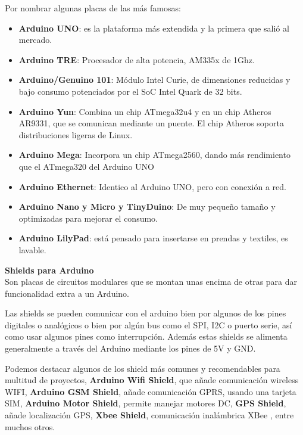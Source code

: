 Por nombrar algunas placas de las más famosas:
\begin{itemize}
	
\item \textbf{Arduino UNO}: es la plataforma más extendida y la primera que salió al mercado.

\item \textbf{Arduino TRE}: Procesador de alta potencia, AM335x de 1Ghz.

\item \textbf{Arduino/Genuino 101}: Módulo Intel Curie, de dimensiones reducidas y bajo consumo potenciados por el SoC Intel Quark de 32 bits.

\item \textbf{Arduino Yun}: Combina un chip ATmega32u4 y en un chip Atheros AR9331, que se comunican mediante un puente. El chip Atheros soporta distribuciones ligeras de Linux. 

\item \textbf{Arduino Mega}: Incorpora un chip ATmega2560, dando más rendimiento que el ATmega320 del Arduino UNO

\item \textbf{Arduino Ethernet}: Identico al Arduino UNO, pero con conexión a red.

\item \textbf{Arduino Nano y Micro y TinyDuino}: De muy pequeño tamaño y optimizadas para mejorar el consumo. 

\item \textbf{Arduino LilyPad}: está pensado para insertarse en prendas y textiles, es lavable. 

\end{itemize}


\textbf{Shields para Arduino} \\ 

Son placas de circuitos modulares que se montan unas encima de otras para dar funcionalidad extra a un Arduino.

\bigskip
Las shields se pueden comunicar con el arduino bien por algunos de los pines digitales o analógicos o bien por algún bus como el SPI, I2C o puerto serie, así como usar algunos pines como interrupción. Además estas shields se alimenta generalmente a través del Arduino mediante los pines de 5V y GND. \cite{shield}

\bigskip
Podemos destacar algunos de los shield más comunes y recomendables para multitud de proyectos, \textbf{Arduino Wifi Shield}, que añade comunicación wireless WIFI, \textbf{Arduino GSM Shield}, añade comunicación GPRS, usando una tarjeta SIM,
\textbf{Arduino Motor Shield}, permite manejar motores DC, \textbf{GPS Shield}, añade localización GPS, \textbf{Xbee Shield}, comunicación inalámbrica XBee \cite{XBee}, entre muchos otros. 


